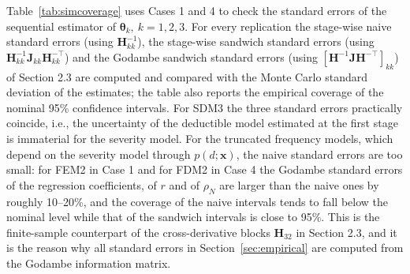 \documentclass[11pt]{article}
\newcommand{\rev}[1]{{\color{blue}#1}}
\begin{document}
\rev{Table~\ref{tab:simcoverage} uses Cases 1 and 4 to check the standard errors of the sequential estimator of $\boldsymbol{\theta}_k, \ k=1,2,3$. For every replication the stage-wise naive standard errors (using $\bm{H}_{kk}^{-1}$), the stage-wise sandwich standard errors (using $\bm{H}_{kk}^{-1}\bm{J}_{kk}\bm{H}_{kk}^{-\top}$) and the Godambe sandwich standard errors (using $[\bm{H}^{-1}\bm{J}\bm{H}^{-\top}]_{kk}$) of Section 2.3 are computed and compared with the Monte Carlo standard deviation of the estimates; the table also reports the empirical coverage of the nominal 95\% confidence intervals. For SDM3 the three standard errors practically coincide, i.e., the uncertainty of the deductible model estimated at the first stage is immaterial for the severity model. For the truncated frequency models, which depend on the severity model through $p(d;\bm{x})$, the naive standard errors are too small: for FEM2 in Case 1 and for FDM2 in Case 4 the Godambe standard errors of the regression coefficients, of $r$ and of $\rho_N$ are larger than the naive ones by roughly 10--20\%, and the coverage of the naive intervals tends to fall below the nominal level while that of the sandwich intervals is close to 95\%. This is the finite-sample counterpart of the cross-derivative blocks $\bm{H}_{32}$ in Section 2.3, and it is the reason why all standard errors in Section~\ref{sec:empirical} are computed from the Godambe information matrix.}
\end{document}
